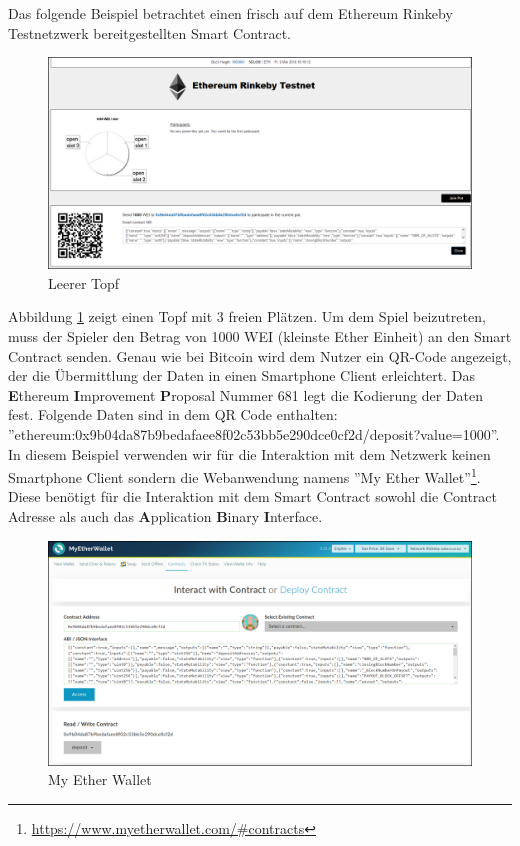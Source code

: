 Das folgende Beispiel betrachtet einen frisch auf dem Ethereum Rinkeby Testnetzwerk bereitgestellten Smart Contract.


\begin{figure}[H]
\centering
\includegraphics[width=1\linewidth]{Figures/eth_gui/ETH_pot_empty}
\decoRule
\caption{Leerer Topf}
\label{fig:ETH_pot_empty}
\end{figure}
Abbildung \ref{fig:ETH_pot_empty} zeigt einen Topf mit 3 freien Plätzen. Um dem Spiel beizutreten, muss der Spieler den Betrag von 1000 WEI (kleinste Ether Einheit) an den Smart Contract senden. Genau wie bei Bitcoin wird dem Nutzer ein QR-Code angezeigt, der die Übermittlung der Daten in einen Smartphone Client erleichtert. Das \textbf{E}thereum \textbf{I}mprovement \textbf{P}roposal Nummer 681\citep{eip21} legt die Kodierung der Daten fest.
Folgende Daten sind in dem QR Code enthalten:\\ ''ethereum:0x9b04da87b9bedafaee8f02c53bb5e290dce0cf2d/deposit?value=1000''. In diesem Beispiel verwenden wir für die Interaktion mit dem Netzwerk keinen Smartphone Client sondern die Webanwendung namens ''My Ether Wallet''\footnote{\url{https://www.myetherwallet.com/\#contracts}}. Diese benötigt für die Interaktion mit dem Smart Contract sowohl die Contract Adresse als auch das \textbf{A}pplication \textbf{B}inary \textbf{I}nterface.


\begin{figure}[H]
\centering
\includegraphics[width=1\linewidth]{Figures/eth_gui/ETH_wallet}
\decoRule
\caption{My Ether Wallet}
\label{fig:ETH_wallet}
\end{figure}

